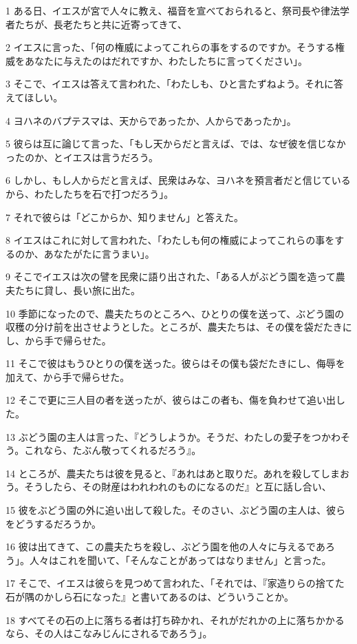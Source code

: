 \par 1 ある日、イエスが宮で人々に教え、福音を宣べておられると、祭司長や律法学者たちが、長老たちと共に近寄ってきて、
\par 2 イエスに言った、「何の権威によってこれらの事をするのですか。そうする権威をあなたに与えたのはだれですか、わたしたちに言ってください」。
\par 3 そこで、イエスは答えて言われた、「わたしも、ひと言たずねよう。それに答えてほしい。
\par 4 ヨハネのバプテスマは、天からであったか、人からであったか」。
\par 5 彼らは互に論じて言った、「もし天からだと言えば、では、なぜ彼を信じなかったのか、とイエスは言うだろう。
\par 6 しかし、もし人からだと言えば、民衆はみな、ヨハネを預言者だと信じているから、わたしたちを石で打つだろう」。
\par 7 それで彼らは「どこからか、知りません」と答えた。
\par 8 イエスはこれに対して言われた、「わたしも何の権威によってこれらの事をするのか、あなたがたに言うまい」。
\par 9 そこでイエスは次の譬を民衆に語り出された、「ある人がぶどう園を造って農夫たちに貸し、長い旅に出た。
\par 10 季節になったので、農夫たちのところへ、ひとりの僕を送って、ぶどう園の収穫の分け前を出させようとした。ところが、農夫たちは、その僕を袋だたきにし、から手で帰らせた。
\par 11 そこで彼はもうひとりの僕を送った。彼らはその僕も袋だたきにし、侮辱を加えて、から手で帰らせた。
\par 12 そこで更に三人目の者を送ったが、彼らはこの者も、傷を負わせて追い出した。
\par 13 ぶどう園の主人は言った、『どうしようか。そうだ、わたしの愛子をつかわそう。これなら、たぶん敬ってくれるだろう』。
\par 14 ところが、農夫たちは彼を見ると、『あれはあと取りだ。あれを殺してしまおう。そうしたら、その財産はわれわれのものになるのだ』と互に話し合い、
\par 15 彼をぶどう園の外に追い出して殺した。そのさい、ぶどう園の主人は、彼らをどうするだろうか。
\par 16 彼は出てきて、この農夫たちを殺し、ぶどう園を他の人々に与えるであろう」。人々はこれを聞いて、「そんなことがあってはなりません」と言った。
\par 17 そこで、イエスは彼らを見つめて言われた、「それでは、『家造りらの捨てた石が隅のかしら石になった』と書いてあるのは、どういうことか。
\par 18 すべてその石の上に落ちる者は打ち砕かれ、それがだれかの上に落ちかかるなら、その人はこなみじんにされるであろう」。

